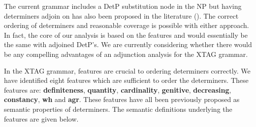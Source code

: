The current grammar includes a DetP substitution node in the NP but having
determiners adjoin on has also been proposed in the literature
(\cite{Abeille90:TAG}).  The correct ordering of determiners and reasonable
coverage is possible with either approach. In fact, the core of our analysis is
based on the features and would essentially be the same with adjoined
DetP's. We are currently considering whether there would be any compelling
advantages of an adjunction analysis for the XTAG grammar.

In the XTAG grammar, features are crucial to ordering determiners correctly.
We have identified eight features which are sufficient to order the
determiners.  These features are: {\bf definiteness}, {\bf quantity}, {\bf
cardinality}, {\bf genitive}, {\bf decreasing}, {\bf constancy}, {\bf wh} and
{\bf agr}.  These features have all been previously proposed as semantic
properties of determiners.  The semantic definitions underlying the features
are given below.

